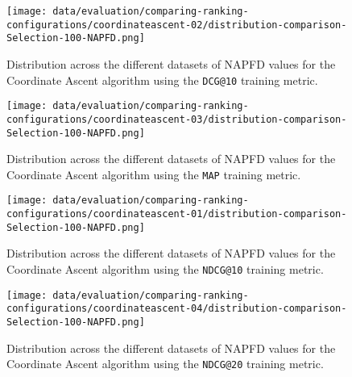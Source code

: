 \begin{figure}
    \centering
    \begin{minipage}{.45\textwidth}
        \centering
        \texttt{[image: data/evaluation/comparing-ranking-configurations/coordinateascent-02/distribution-comparison-Selection-100-NAPFD.png]}
        \parbox{0.9\textwidth}{
            \caption{Distribution across the different datasets of NAPFD values for the Coordinate Ascent algorithm using the \texttt{DCG@10} training metric.}
            \label{fig:coordinate-ascent-02-napfd}
            }
    \end{minipage}%
    \begin{minipage}{.45\textwidth}
        \centering
        \texttt{[image: data/evaluation/comparing-ranking-configurations/coordinateascent-03/distribution-comparison-Selection-100-NAPFD.png]}
        \parbox{0.9\textwidth}{
            \caption{Distribution across the different datasets of NAPFD values for the Coordinate Ascent algorithm using the \texttt{MAP} training metric.}
            \label{fig:coordinate-ascent-03-napfd}
            }
    \end{minipage}%
\end{figure}

\begin{figure}
    \centering
    \begin{minipage}{.45\textwidth}
        \centering
        \texttt{[image: data/evaluation/comparing-ranking-configurations/coordinateascent-01/distribution-comparison-Selection-100-NAPFD.png]}
        \parbox{0.9\textwidth}{
            \caption{Distribution across the different datasets of NAPFD values for the Coordinate Ascent algorithm using the \texttt{NDCG@10} training metric.}
        \label{fig:coordinate-ascent-01-napfd}
            }
    \end{minipage}%
    \begin{minipage}{.45\textwidth}
        \centering
        \texttt{[image: data/evaluation/comparing-ranking-configurations/coordinateascent-04/distribution-comparison-Selection-100-NAPFD.png]}
        \parbox{0.9\textwidth}{
            \caption{Distribution across the different datasets of NAPFD values for the Coordinate Ascent algorithm using the \texttt{NDCG@20} training metric.}
        \label{fig:coordinate-ascent-04-napfd}
            }
    \end{minipage}%
\end{figure}

